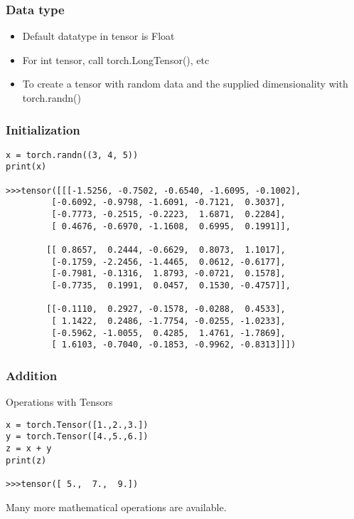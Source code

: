  
\begin{frame}[fragile]
\frametitle{Data type}
\begin{itemize}
\item Default datatype in tensor is Float
\item For int tensor, call torch.LongTensor(), etc
\item To create a tensor with random data and the supplied dimensionality with torch.randn()
\end{itemize}

 \end{frame} 
 
\begin{frame}[fragile]
\frametitle{Initialization}
 \begin{lstlisting}
x = torch.randn((3, 4, 5))
print(x)

>>>tensor([[[-1.5256, -0.7502, -0.6540, -1.6095, -0.1002],
         [-0.6092, -0.9798, -1.6091, -0.7121,  0.3037],
         [-0.7773, -0.2515, -0.2223,  1.6871,  0.2284],
         [ 0.4676, -0.6970, -1.1608,  0.6995,  0.1991]],

        [[ 0.8657,  0.2444, -0.6629,  0.8073,  1.1017],
         [-0.1759, -2.2456, -1.4465,  0.0612, -0.6177],
         [-0.7981, -0.1316,  1.8793, -0.0721,  0.1578],
         [-0.7735,  0.1991,  0.0457,  0.1530, -0.4757]],

        [[-0.1110,  0.2927, -0.1578, -0.0288,  0.4533],
         [ 1.1422,  0.2486, -1.7754, -0.0255, -1.0233],
         [-0.5962, -1.0055,  0.4285,  1.4761, -1.7869],
         [ 1.6103, -0.7040, -0.1853, -0.9962, -0.8313]]])
 \end{lstlisting}

 \end{frame} 
 
\begin{frame}[fragile]
\frametitle{Addition}
Operations with Tensors
 \begin{lstlisting}
x = torch.Tensor([1.,2.,3.])
y = torch.Tensor([4.,5.,6.])
z = x + y
print(z)

>>>tensor([ 5.,  7.,  9.])
 \end{lstlisting}
Many more mathematical operations are available.
 \end{frame} 
 

